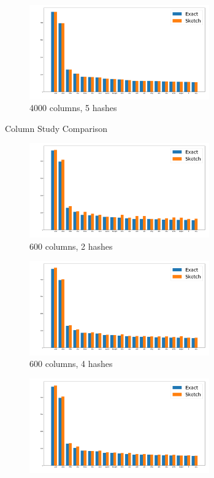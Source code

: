 \documentclass[shortpaper]{revdetua}
\begin{document}
\begin{figure}[ht]
    \begin{subfigure}[t]{0.5\textwidth}
        \includegraphics[height=1.6in]{englishAlice4000_5.png}
        \caption{4000 columns, 5 hashes}
    \end{subfigure}
    \caption{Column Study Comparison}
    \label{fig:columnSketchComp}
\end{figure}
\begin{figure}[ht]
    \onecolumn
    \begin{subfigure}[t]{0.5\textwidth}
        \includegraphics[height=1.6in]{englishAlice600_2.png}
        \caption{600 columns, 2 hashes} 
    \end{subfigure}
    \begin{subfigure}[t]{0.5\textwidth}
        \includegraphics[height=1.6in]{englishAlice600_4.png}
        \caption{600 columns, 4 hashes}
    \end{subfigure}
    \begin{subfigure}[t]{0.5\textwidth}
        \includegraphics[height=1.6in]{englishAlice600_6.png}

\end{subfigure}
\end{figure}
\end{document}
